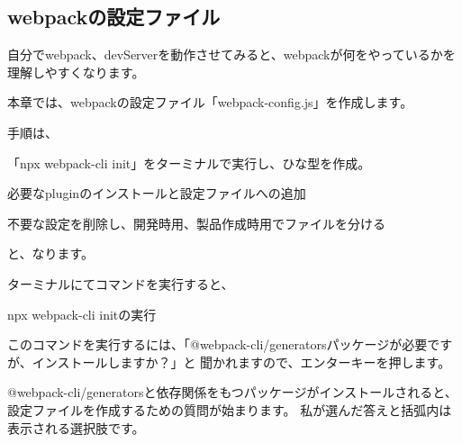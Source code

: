 \clearpage


\subsection{webpackの設定ファイル}
\keeplastskip{
  \label{sec:2-2-4}
  \label{04-webpack-config}
  \par\nobreak
}

自分でwebpack、devServerを動作させてみると、webpackが何をやっているかを理解しやすくなります。

本章では、webpackの設定ファイル「webpack{-}config.js」を作成します。

\vspace*{\baselineskip}

手順は、

\begin{starterenumerate}
\item 「npx webpack{-}cli init」をターミナルで実行し、ひな型を作成。
\item 必要なpluginのインストールと設定ファイルへの追加
\item 不要な設定を削除し、開発時用、製品作成時用でファイルを分ける
\end{starterenumerate}

と、なります。

ターミナルにてコマンドを実行すると、\\[0pt]

\def\startercodeblockfontsize{}
\begin{starterterminal}[]{npx webpack{-}cli initの実行}\end{starterterminal}

このコマンドを実行するには、「@webpack{-}cli/generatorsパッケージが必要ですが、インストールしますか？」と
聞かれますので、エンターキーを押します。

\vspace*{\baselineskip}

@webpack{-}cli/generatorsと依存関係をもつパッケージがインストールされると、設定ファイルを作成するための質問が始まります。
私が選んだ答えと括弧内は表示される選択肢です。

\vspace*{\baselineskip}

